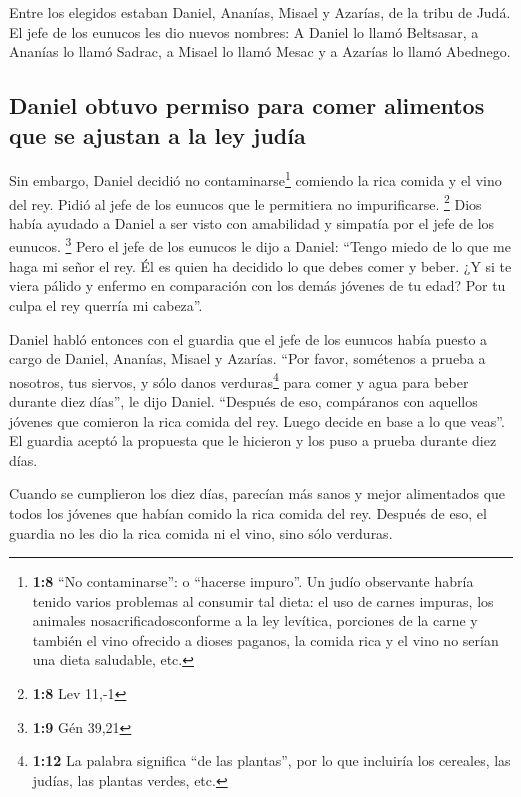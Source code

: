 Entre los elegidos estaban Daniel, Ananías, Misael y
Azarías, de la tribu de Judá.  El jefe de los eunucos les
dio nuevos nombres: A Daniel lo llamó Beltsasar, a Ananías lo llamó
Sadrac, a Misael lo llamó Mesac y a Azarías lo llamó Abednego.

\hypertarget{daniel-obtuvo-permiso-para-comer-alimentos-que-se-ajustan-a-la-ley-juduxeda}{%
\subsection{Daniel obtuvo permiso para comer alimentos que se ajustan a
la ley
judía}\label{daniel-obtuvo-permiso-para-comer-alimentos-que-se-ajustan-a-la-ley-juduxeda}}

 Sin embargo, Daniel decidió no contaminarse\footnote{\textbf{1:8}
  ``No contaminarse'': o ``hacerse impuro''. Un judío observante habría
  tenido varios problemas al consumir tal dieta: el uso de carnes
  impuras, los animales nosacrificadosconforme a la ley levítica,
  porciones de la carne y también el vino ofrecido a dioses paganos, la
  comida rica y el vino no serían una dieta saludable, etc.} comiendo la
rica comida y el vino del rey. Pidió al jefe de los eunucos que le
permitiera no impurificarse. \footnote{\textbf{1:8} Lev 11,-1}
 Dios había ayudado a Daniel a ser visto con amabilidad y
simpatía por el jefe de los eunucos. \footnote{\textbf{1:9} Gén 39,21}
 Pero el jefe de los eunucos le dijo a Daniel: ``Tengo
miedo de lo que me haga mi señor el rey. Él es quien ha decidido lo que
debes comer y beber. ¿Y si te viera pálido y enfermo en comparación con
los demás jóvenes de tu edad? Por tu culpa el rey querría mi cabeza''.

 Daniel habló entonces con el guardia que el jefe de los
eunucos había puesto a cargo de Daniel, Ananías, Misael y Azarías.
 ``Por favor, sométenos a prueba a nosotros, tus siervos,
y sólo danos verduras\footnote{\textbf{1:12} La palabra significa ``de
  las plantas'', por lo que incluiría los cereales, las judías, las
  plantas verdes, etc.} para comer y agua para beber durante diez
días'', le dijo Daniel.  ``Después de eso, compáranos con
aquellos jóvenes que comieron la rica comida del rey. Luego decide en
base a lo que veas''.  El guardia aceptó la propuesta que
le hicieron y los puso a prueba durante diez días.

 Cuando se cumplieron los diez días, parecían más sanos y
mejor alimentados que todos los jóvenes que habían comido la rica comida
del rey.  Después de eso, el guardia no les dio la rica
comida ni el vino, sino sólo verduras.

